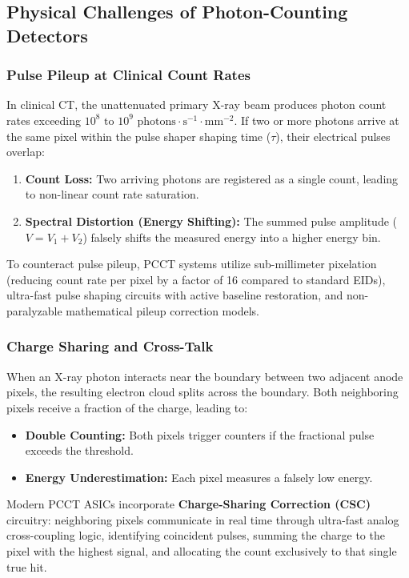 \documentclass[11pt,a4paper]{article}
\begin{document}
\subsection{Physical Challenges of Photon-Counting Detectors}

\subsubsection{Pulse Pileup at Clinical Count Rates}
In clinical CT, the unattenuated primary X-ray beam produces photon count rates exceeding \textbf{$10^8\text{ to }10^9\text{ photons}\cdot\text{s}^{-1}\cdot\text{mm}^{-2}$}. If two or more photons arrive at the same pixel within the pulse shaper shaping time ($\tau$), their electrical pulses overlap:
\begin{enumerate}
    \item \textbf{Count Loss:} Two arriving photons are registered as a single count, leading to non-linear count rate saturation.
    \item \textbf{Spectral Distortion (Energy Shifting):} The summed pulse amplitude ($V = V_1 + V_2$) falsely shifts the measured energy into a higher energy bin.
\end{enumerate}
To counteract pulse pileup, PCCT systems utilize sub-millimeter pixelation (reducing count rate per pixel by a factor of 16 compared to standard EIDs), ultra-fast pulse shaping circuits with active baseline restoration, and non-paralyzable mathematical pileup correction models.

\subsubsection{Charge Sharing and Cross-Talk}
When an X-ray photon interacts near the boundary between two adjacent anode pixels, the resulting electron cloud splits across the boundary. Both neighboring pixels receive a fraction of the charge, leading to:
\begin{itemize}
    \item \textbf{Double Counting:} Both pixels trigger counters if the fractional pulse exceeds the threshold.
    \item \textbf{Energy Underestimation:} Each pixel measures a falsely low energy.
\end{itemize}
Modern PCCT ASICs incorporate \textbf{Charge-Sharing Correction (CSC)} circuitry: neighboring pixels communicate in real time through ultra-fast analog cross-coupling logic, identifying coincident pulses, summing the charge to the pixel with the highest signal, and allocating the count exclusively to that single true hit.
\end{document}
